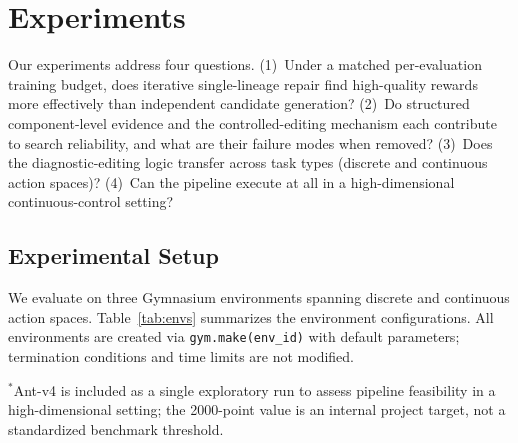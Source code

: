 \documentclass[letterpaper,twocolumn,10pt]{article}
\begin{document}
\section{Experiments}

Our experiments address four questions. (1)~Under a matched per-evaluation training budget, does iterative single-lineage repair find high-quality rewards more effectively than independent candidate generation? (2)~Do structured component-level evidence and the controlled-editing mechanism each contribute to search reliability, and what are their failure modes when removed? (3)~Does the diagnostic-editing logic transfer across task types (discrete and continuous action spaces)? (4)~Can the pipeline execute at all in a high-dimensional continuous-control setting?

\subsection{Experimental Setup}

We evaluate on three Gymnasium environments spanning discrete and continuous action spaces. Table~\ref{tab:envs} summarizes the environment configurations. All environments are created via \texttt{gym.make(env\_id)} with default parameters; termination conditions and time limits are not modified.

\begin{table}[t]
\centering
\caption{Environment and training configurations. Steps/Reward = PPO training steps per reward evaluation. Search Runs = number of independent search paths. Max Evals = maximum reward evaluations per search path. \label{tab:envs}}
\end{table}

\noindent $^*$Ant-v4 is included as a single exploratory run to assess pipeline feasibility in a high-dimensional setting; the 2000-point value is an internal project target, not a standardized benchmark threshold.
\end{document}
